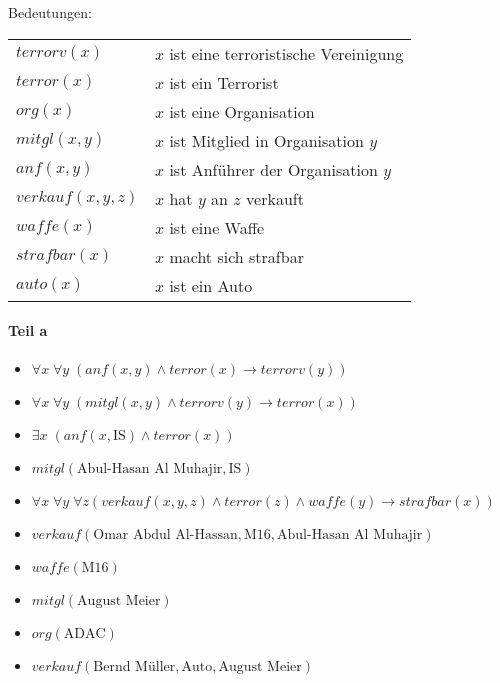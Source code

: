 Bedeutungen:\\
\begin{tabular}{l l}
$terrorv(x)$ & $x$ ist eine terroristische Vereinigung\\
$terror(x)$ & $x$ ist ein Terrorist\\
$org(x)$ & $x$ ist eine Organisation\\
$mitgl(x,y)$ & $x$ ist Mitglied in Organisation $y$\\
$anf(x,y)$ & $x$ ist Anführer der Organisation $y$\\
$verkauf(x,y,z)$ & $x$ hat $y$ an $z$ verkauft\\
$waffe(x)$ & $x$ ist eine Waffe\\
$strafbar(x)$ & $x$ macht sich strafbar\\
$auto(x)$ & $x$ ist ein Auto
\end{tabular}
\paragraph*{Teil a}
\begin{itemize}
\item $\forall x\; \forall y\;(anf(x,y) \wedge terror(x) \to terrorv(y) )$
\item $\forall x\;\forall y\; (mitgl(x,y) \wedge terrorv(y) \to terror(x))$
\item $\exists x\; (anf(x,\text{IS}) \wedge terror(x))$
\item $mitgl(\text{Abul-Hasan Al Muhajir},\text{IS})$
\item $\forall x\; \forall y\; \forall z ( verkauf(x,y,z) \wedge terror(z) \wedge waffe(y) \to strafbar(x))$
\item $verkauf(\text{Omar Abdul Al-Hassan},\text{M16},\text{Abul-Hasan Al Muhajir})$
\item $waffe(\text{M16})$
\item $mitgl(\text{August Meier})$
\item $org(\text{ADAC})$
\item $verkauf(\text{Bernd Müller}, \text{Auto},\text{August Meier})$
\end{itemize}

